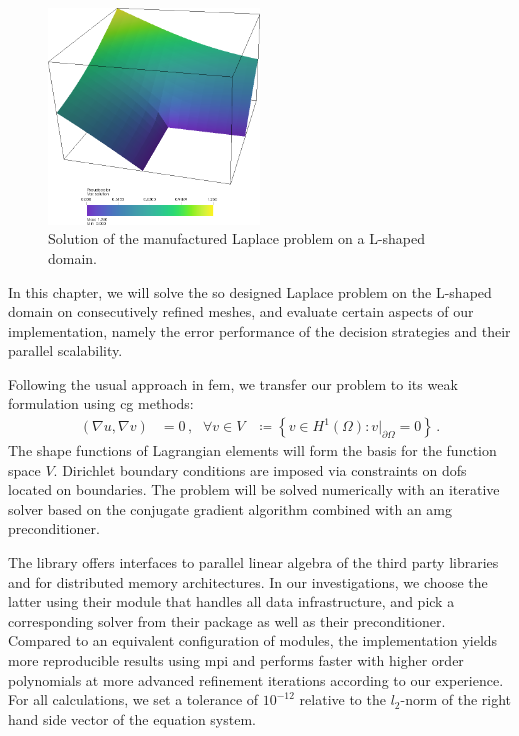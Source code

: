 \begin{figure}
\centering
\includegraphics[width=0.5\textwidth]{figures/results/solution.png}
\caption{Solution of the manufactured Laplace problem on a L-shaped domain.}
\label{fig:solution}
\end{figure}

In this chapter, we will solve the so designed Laplace problem on the L-shaped domain on consecutively refined meshes, and evaluate certain aspects of our implementation, namely the error performance of the decision strategies and their parallel scalability.

Following the usual approach in \gls{fem}, we transfer our problem to its weak formulation using \gls{cg} methods:
\begin{align}
\left(\nabla u, \nabla v\right) &= 0 \,\text{,} & \forall v \in V &\coloneqq \left\{ v \in H^1(\Omega): v|_{\partial\Omega} = 0 \right\} \,\text{.}
\end{align}
The shape functions of Lagrangian elements will form the basis for the function space $V$. Dirichlet boundary conditions are imposed via constraints on \glspl{dof} located on boundaries. The problem will be solved numerically with an iterative solver based on the conjugate gradient algorithm combined with an \gls{amg} preconditioner.

The \dealii{} library offers interfaces to parallel linear algebra of the third party libraries \petsc{} \textcite{petsc3124} and \trilinos{} \textcite{trilinos12181} for distributed memory architectures. In our investigations, we choose the latter using their \epetra{}
module that handles all data infrastructure, and pick a corresponding solver from their \aztecoo{}
package as well as their \ml{}
preconditioner. Compared to an equivalent configuration of \petsc{} modules, the \trilinos{} implementation yields more reproducible results using \gls{mpi} \parencite[FAQ]{petsc3124} and performs faster with higher order polynomials at more advanced refinement iterations according to our experience. For all calculations, we set a tolerance of $10^{-12}$ relative to the $l_2$-norm of the right hand side vector of the equation system.





